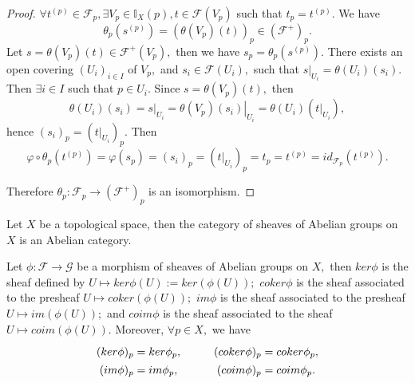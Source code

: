 \begin{proof}
$\forall t^{(p)}\in \mathscr{F}_p, \exists V_p\in \mathds{I}_X(p),
t\in \mathscr{F}(V_p)$ such that $t_p=t^{(p)}.$ We have
$$\theta_p(s^{(p)})=(\theta(V_p)(t))_p\in (\mathscr{F}^+)_p.$$
Let $s=\theta(V_p)(t)\in \mathscr{F}^+(V_p),$ then we have
$s_p=\theta_p(s^{(p)}).$ There exists an open covering $(U_i)_{i\in
I}$ of $V_p,$ and $s_i\in \mathscr{F}(U_i),$ such that
$\left.s\right|_{U_i}=\theta(U_i)(s_i).$ Then $\exists i\in I$ such
that $p\in U_i.$ Since $s=\theta(V_p)(t),$ then
$$\theta(U_i)(s_i) = \left.s\right|_{U_i} =
\left.\theta(V_p)(s_i)\right|_{U_i} =
\theta(U_i)(\left.t\right|_{U_i}),$$ hence $(s_i)_p =
(\left.t\right|_{U_i})_p.$ Then
$$\varphi\circ\theta_p(t^{(p)}) = \varphi(s_p) = (s_i)_p =
(\left.t\right|_{U_i})_p = t_p = t^{(p)} =
id_{\mathscr{F}_p}(t^{(p)}).$$

Therefore $\theta_p: \mathscr{F}_p\rightarrow (\mathscr{F}^+)_p$ is
an isomorphism.
\end{proof}
\begin{prop}
Let $X$ be a topological space, then the category of sheaves of
Abelian groups on $X$ is an Abelian category.

Let $\phi: \mathscr{F}\rightarrow \mathscr{G}$ be a morphism of
sheaves of Abelian groups on $X,$ then $ker\phi$ is the sheaf
defined by $U\mapsto ker\phi(U):=ker(\phi(U));$ $coker\phi$ is the
sheaf associated to the presheaf $U\mapsto coker(\phi(U));$ $im\phi$
is the sheaf associated to the presheaf $U\mapsto im(\phi(U));$ and
$coim\phi$ is the sheaf associated to the sheaf $U\mapsto
coim(\phi(U)).$ Moreover, $\forall p\in X,$ we have
\[ \xymatrix@R=0em{
   (ker\phi)_p=ker\phi_p, & (coker\phi)_p=coker\phi_p,  \\
   (im\phi)_p=im\phi_p, & (coim\phi)_p=coim\phi_p. }  \]
\end{prop}
